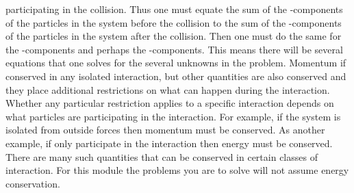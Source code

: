 {participating in the collision.
Thus one must equate the sum of the -components of the particles in the system before the collision to
the sum of the -components of the particles in the system after the collision.
Then one must do the same for the -components and perhaps the -components.
This means there will be several equations that one solves for the several unknowns in the problem.
%
Momentum if conserved in any isolated interaction, but other quantities are also conserved and they
place additional restrictions on what can happen during the interaction.
Whether any particular restriction applies to a specific interaction depends on what particles
are participating in the interaction.
For example, if the system is isolated from outside forces then momentum must be conserved.
As another example, if only  participate in the interaction then
energy must be conserved.
%
%
There are many such quantities that can be conserved in certain classes of interaction.
For this module the problems you are to solve will not assume energy conservation.


}
